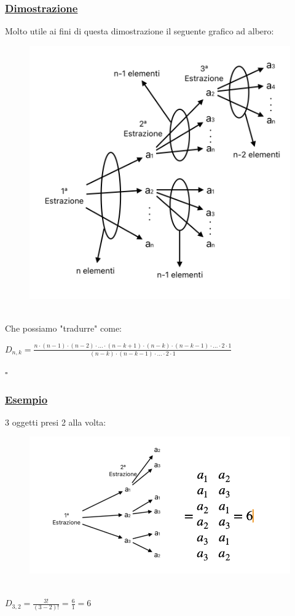 \documentclass{article}
\begin{document}
\subsubsection{\underline{Dimostrazione}}
Molto utile ai fini di questa dimostrazione il seguente grafico ad albero: 
\begin{figure}[ht]
\centering
\includegraphics[scale=0.35]{3.Dispo1.png}
\end{figure} \\
Che possiamo "tradurre" come:
\begin{center}
    $D_{n,k} = \frac{n \cdot (n-1) \cdot (n-2) \cdot \dots \cdot(n-k+1) \cdot (n-k) \cdot (n-k-1) \cdot \dots \cdot 2 \cdot 1}{(n-k) \cdot (n-k-1) \cdot \dots \cdot 2 \cdot 1}$
\end{center}
\hspace*{0pt}\hfill $\square$ \\
\subsubsection{\underline{Esempio}}
3 oggetti presi 2 alla volta:
\begin{figure}[ht]
\centering
\includegraphics[scale=0.4]{4.Dispo2.png}
\end{figure} \\
$D_{3,2} = \frac{3!}{(3-2)!} = \frac{6}{1} = 6$
\end{document}
